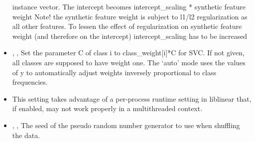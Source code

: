 \begin{itemize}
  instance vector.
  The intercept becomes intercept\_scaling * synthetic feature
  weight Note! the synthetic feature weight is subject to l1/l2 regularization
  as all other features.
  To lessen the effect of regularization on synthetic feature weight (and
  therefore on the intercept) intercept\_scaling has to be
  increased
  \item {} , ,
  Set the parameter C of class i to class\_weight[i]*C for SVC.
  If not given, all classes are supposed to have weight one.
  The ‘auto’ mode uses the values of y to automatically adjust weights
  inversely proportional to class frequencies.
  \item \verDescriptionB
  \nb This setting takes advantage of a per-process runtime setting in
  liblinear that, if enabled, may not work properly in a multithreaded context.
  \item {} , ,
  The seed of the pseudo random number generator to use when shuffling the data.
\end{itemize}

